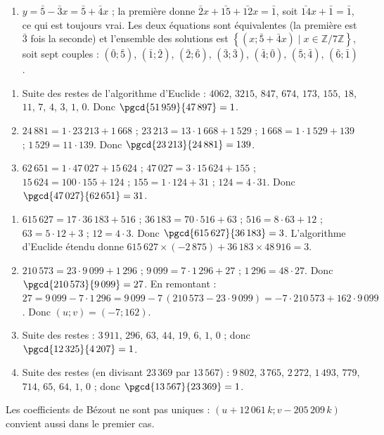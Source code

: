 \begin{corrige}
\begin{sol}
\begin{enumerate}
\begin{enumerate}
      \item $y = \bar{5} - \bar{3}x = \bar{5} + \bar{4}x$ ; la premi\`ere donne $\bar{2}x + \bar{15} + \bar{12}x = \bar{1}$, soit
            $\bar{14}x + \bar{1} = \bar{1}$, ce qui est toujours vrai. Les deux \'equations sont \'equivalentes
            (la premi\`ere est $\bar{3}$ fois la seconde) et l'ensemble des solutions est
            $\left\lbrace (x ; \bar{5} + \bar{4}x) \mid x \in \mathbb{Z}/7\mathbb{Z} \right\rbrace$, soit sept couples :
            $(\bar{0};\bar{5})$, $(\bar{1};\bar{2})$, $(\bar{2};\bar{6})$, $(\bar{3};\bar{3})$, $(\bar{4};\bar{0})$, $(\bar{5};\bar{4})$, $(\bar{6};\bar{1})$.
      \end{enumerate}
\end{enumerate}
\end{sol}
%
\begin{sol}
\begin{enumerate}[label=\alph*)]
\item Suite des restes de l'algorithme d'Euclide : $4062$, $3215$, $847$, $674$, $173$, $155$, $18$, $11$, $7$, $4$, $3$, $1$, $0$.
      Donc $\pgcd{51\,959}{47\,897} = 1$.
\item $24\,881 = 1 \cdot 23\,213 + 1\,668$ ; $23\,213 = 13 \cdot 1\,668 + 1\,529$ ; $1\,668 = 1 \cdot 1\,529 + 139$ ; $1\,529 = 11 \cdot 139$.
      Donc $\pgcd{23\,213}{24\,881} = 139$.
\item $62\,651 = 1 \cdot 47\,027 + 15\,624$ ; $47\,027 = 3 \cdot 15\,624 + 155$ ; $15\,624 = 100 \cdot 155 + 124$ ;
      $155 = 1 \cdot 124 + 31$ ; $124 = 4 \cdot 31$. Donc $\pgcd{47\,027}{62\,651} = 31$.
\end{enumerate}
\end{sol}
%
\begin{sol}
\begin{enumerate}
\item $615\,627 = 17 \cdot 36\,183 + 516$ ; $36\,183 = 70 \cdot 516 + 63$ ; $516 = 8 \cdot 63 + 12$ ; $63 = 5 \cdot 12 + 3$ ; $12 = 4 \cdot 3$.
      Donc $\pgcd{615\,627}{36\,183} = 3$. L'algorithme d'Euclide \'etendu donne
      $615\,627 \times (-2\,875) + 36\,183 \times 48\,916 = 3$.
\item $210\,573 = 23 \cdot 9\,099 + 1\,296$ ; $9\,099 = 7 \cdot 1\,296 + 27$ ; $1\,296 = 48 \cdot 27$. Donc $\pgcd{210\,573}{9\,099} = 27$.
      En remontant : $27 = 9\,099 - 7 \cdot 1\,296 = 9\,099 - 7\,(210\,573 - 23 \cdot 9\,099) = -7 \cdot 210\,573 + 162 \cdot 9\,099$.
      Donc $(u ; v) = (-7 ; 162)$.
\item Suite des restes : $3\,911$, $296$, $63$, $44$, $19$, $6$, $1$, $0$ ; donc $\pgcd{12\,325}{4\,207} = 1$.
\item Suite des restes (en divisant $23\,369$ par $13\,567$) : $9\,802$, $3\,765$, $2\,272$, $1\,493$, $779$, $714$, $65$, $64$, $1$, $0$ ;
      donc $\pgcd{13\,567}{23\,369} = 1$.
\end{enumerate}
Les coefficients de B\'ezout ne sont pas uniques : $(u + 12\,061\,k ; v - 205\,209\,k)$ convient aussi dans le premier cas.
\end{sol}
%

\end{corrige}
